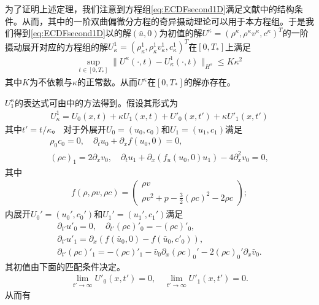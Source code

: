 为了证明上述定理，我们注意到方程组\eqref{eq:ECDFsecond1D}满足文献\cite{yong1992singular,yong1999singular}中的结构条件。从而，其中的一阶双曲偏微分方程的奇异摄动理论可以用于本方程组。于是我们得到\eqref{eq:ECDFsecond1D}以的解$(\bar{u},0)$为初值的解$U^\kappa = (\rho^\kappa, \rho^\kappa v^\kappa, c^\kappa)^T$的一阶摄动展开对应的方程组的解$U_\kappa^1=(\rho_\kappa^1,\rho_\kappa^1 v_\kappa^1, c^1_\kappa)^T$在$[0,T_*]$上满足
\begin{eqnarray}\label{53}
  \sup_{t \in [0, T_*]} \|U^\kappa(\cdot, t) - U_\kappa^1(\cdot, t)\|_{H^s} \le K\kappa^2
\end{eqnarray}
其中$K$为不依赖与$\kappa$的正常数。从而$U^\kappa$在$[0,T_*]$的解亦存在。

$U^\kappa_1$的表达式可由\cite{yong1992singular,yong1999singular}中的方法得到。假设其形式为
\begin{eqnarray*}
U^1_\kappa  = U_0(x,t) + \kappa U_1(x,t) + U'_0(x,t') + \kappa U'_1(x,t')
\end{eqnarray*}
其中$t'=t/\kappa$。
对于外展开$U_0=(u_0, c_0)$和$U_1=(u_1, c_1)$满足
\begin{eqnarray}
 \rho_0 c_0 = 0, \quad
  \partial_t u_0+ \partial_x f(u_0,0)=0 , \nonumber \\
  (\rho c)_1 = 2\partial_x v_0, \quad
  \partial_t u_1 + \partial_x (f_u(u_0,0) u_1)  -4 \partial^2_x v_0 = 0 \label{54},
	\end{eqnarray}
其中
\begin{eqnarray*}
  f(\rho,\rho v,\rho c) = \left( \begin{array}{cc} \rho v \\ \rho v^2 + p - \frac{3}{2} (\rho c)^2 - 2\rho c \end{array} \right);
\end{eqnarray*}
内展开$U_0'=(u_0', c_0')$和$U_1'=(u_1', c_1')$满足
\begin{eqnarray*}
 \partial_{t'} u'_0 = 0,  \quad \partial_{t'} (\rho c)'_0 = -(\rho c)'_0 , \\
  \partial_{t'} u'_1 = \partial_x(f(\bar u_0,0) - f(\bar u_0,c'_0)), \\
  \partial_{t'} (\rho c)'_1 = - (\rho c)'_1 - \bar v_0 \partial_x (\rho c)_0' -2 (\rho c)_0'\partial_x \bar v_0.
\end{eqnarray*}
其初值由下面的匹配条件决定。
\begin{eqnarray*}
  \lim_{t' \to \infty} U'_0(x,t') = 0 , \quad \lim_{t' \to \infty} U'_1(x,t') = 0 .
\end{eqnarray*}
从而有
